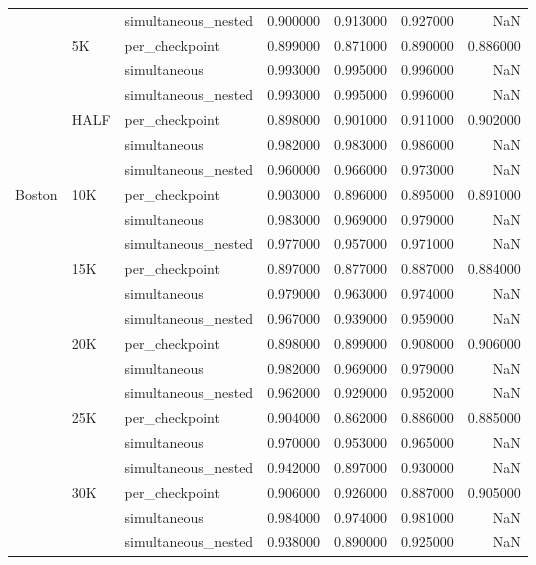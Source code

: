 \begin{tabular}{lllrrrr}
 &  & simultaneous\_nested & 0.900000 & 0.913000 & 0.927000 & NaN \\
\cline{2-7}
 & \multirow[t]{3}{*}{5K} & per\_checkpoint & 0.899000 & 0.871000 & 0.890000 & 0.886000 \\
 &  & simultaneous & 0.993000 & 0.995000 & 0.996000 & NaN \\
 &  & simultaneous\_nested & 0.993000 & 0.995000 & 0.996000 & NaN \\
\cline{2-7}
 & \multirow[t]{3}{*}{HALF} & per\_checkpoint & 0.898000 & 0.901000 & 0.911000 & 0.902000 \\
 &  & simultaneous & 0.982000 & 0.983000 & 0.986000 & NaN \\
 &  & simultaneous\_nested & 0.960000 & 0.966000 & 0.973000 & NaN \\
\cline{1-7} \cline{2-7}
\multirow[t]{27}{*}{Boston} & \multirow[t]{3}{*}{10K} & per\_checkpoint & 0.903000 & 0.896000 & 0.895000 & 0.891000 \\
 &  & simultaneous & 0.983000 & 0.969000 & 0.979000 & NaN \\
 &  & simultaneous\_nested & 0.977000 & 0.957000 & 0.971000 & NaN \\
\cline{2-7}
 & \multirow[t]{3}{*}{15K} & per\_checkpoint & 0.897000 & 0.877000 & 0.887000 & 0.884000 \\
 &  & simultaneous & 0.979000 & 0.963000 & 0.974000 & NaN \\
 &  & simultaneous\_nested & 0.967000 & 0.939000 & 0.959000 & NaN \\
\cline{2-7}
 & \multirow[t]{3}{*}{20K} & per\_checkpoint & 0.898000 & 0.899000 & 0.908000 & 0.906000 \\
 &  & simultaneous & 0.982000 & 0.969000 & 0.979000 & NaN \\
 &  & simultaneous\_nested & 0.962000 & 0.929000 & 0.952000 & NaN \\
\cline{2-7}
 & \multirow[t]{3}{*}{25K} & per\_checkpoint & 0.904000 & 0.862000 & 0.886000 & 0.885000 \\
 &  & simultaneous & 0.970000 & 0.953000 & 0.965000 & NaN \\
 &  & simultaneous\_nested & 0.942000 & 0.897000 & 0.930000 & NaN \\
\cline{2-7}
 & \multirow[t]{3}{*}{30K} & per\_checkpoint & 0.906000 & 0.926000 & 0.887000 & 0.905000 \\
 &  & simultaneous & 0.984000 & 0.974000 & 0.981000 & NaN \\
 &  & simultaneous\_nested & 0.938000 & 0.890000 & 0.925000 & NaN \\

\end{tabular}
